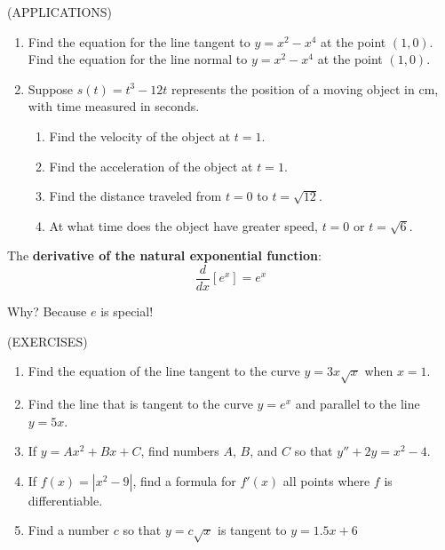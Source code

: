 \documentclass[11pt]{article}
\begin{document}
  (APPLICATIONS)
  \begin{enumerate}
  \item{Find the equation for the line tangent to $y=x^2-x^4$ at the point $(1,0)$. Find the equation for the line normal to $y=x^2-x^4$ at the point $(1,0)$.}

  \vspace{2in}

  
  \pagebreak
  
\item{Suppose $s(t) = t^3-12t$ represents the position of a moving object in cm, with time measured in seconds.
  \begin{enumerate}
  \item{Find the velocity of the object at $t=1$.}
  \item{Find the acceleration of the object at $t=1$.}
  \item{Find the distance traveled from $t=0$ to $t=\sqrt{12}$.}
  \item{At what time does the object have greater speed, $t=0$ or $t=\sqrt{6}$.}
  \end{enumerate}
}
    \end{enumerate}
  


  \vspace{3in}

The {\bf derivative of the natural exponential function}:
\begin{displaymath}
\frac{d}{dx}\left[e^x  \right] = e^x
  \end{displaymath}

\vspace{0.1in}
Why?  Because $e$ is special!
  
      \pagebreak
(EXERCISES)

    \begin{enumerate}
    \item{Find the equation of the line tangent to the curve $y=3x\sqrt{x}$ when $x=1$.}
      \vspace{3in}

      \item{Find the line that is tangent to the curve $y=e^x$ and parallel to the line $y=5x$.}
          \vspace{3in}
        \item{If $y=Ax^2 + Bx + C$, find numbers $A$, $B$, and $C$ so that $y'' + 2y = x^2 -4$.}
            \vspace{3in}
          \item{If $f(x)=|x^2-9|$, find a formula for $f'(x)$ all points where $f$ is differentiable.}
              \vspace{3in}
          \item{Find a number $c$ so that $y=c\sqrt{x}$ is tangent to $y=1.5x+6$}
              \vspace{3in}
  \end{enumerate}

\vspace{3.5in}
\end{document}
